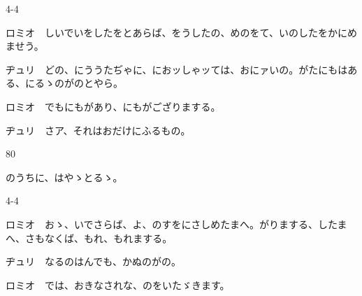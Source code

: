 \documentclass[tate,paper=b6j,jafontsize=9pt]{jlreq}
\begin{document}
\begin{azconvIndented}{4\zw}{-4\zw}

ロミオ　しいでいをしたをとあらば、をうしたの、めのをて、いのしたをかにめませう。

ヂュリ　どの、にううたぢゃに、におッしゃッては、おにァいの。がたにもはある、にるゝのがのとやら。

ロミオ　でもにもがあり、にもがござりまする。

ヂュリ　さア、それはおだけにふるもの。

\end{azconvIndented}
\begin{azconvIndented}{8\zw}{0\zw}

のうちに、はやゝとるゝ。

\end{azconvIndented}
\begin{azconvIndented}{4\zw}{-4\zw}

ロミオ　おゝ、いでさらば、よ、のすをにさしめたまへ。がりまする、したまへ、さもなくば、もれ、もれまする。

ヂュリ　なるのはんでも、かぬのがの。

ロミオ　では、おきなされな、のをいたゞきます。

\end{azconvIndented}
\end{document}
